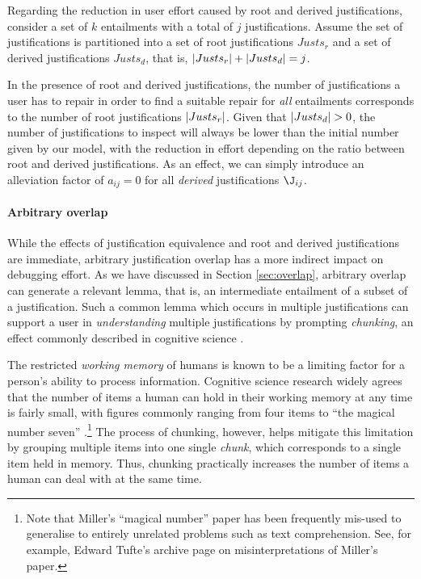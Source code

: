 Regarding the reduction in user effort caused by root and derived justifications, consider a set of $k$ entailments with a total of $j$ justifications. Assume the set of justifications is partitioned into a set of root justifications $Justs_{r}$ and a set of derived justifications $Justs_{d}$, that is, $ \left|{Justs_{r}}\right| +  \left|{Justs_{d}}\right| = j$.

In the presence of root and derived justifications, the number of justifications a user has to repair in order to find a suitable repair for \emph{all} entailments corresponds to the number of root justifications $ \left|{Justs_{r}}\right|$. Given that $ \left|{Justs_{d}}\right| > 0$, the number of justifications to inspect will always be lower than the initial number given by our model, with the reduction in effort depending on the ratio between root and derived justifications. As an effect, we can simply introduce an alleviation factor of $a_{ij} = 0$ for all \emph{derived} justifications $\J_{ij}$.

\paragraph{Arbitrary overlap}

While the effects of justification equivalence and root and derived justifications are immediate, arbitrary justification overlap has a more indirect impact on debugging effort. As we have discussed in Section \ref{sec:overlap}, arbitrary overlap can generate a relevant lemma, that is, an intermediate entailment of a subset of a justification. Such a common lemma which occurs in multiple justifications can support a user in \emph{understanding} multiple justifications by prompting \emph{chunking}, an effect commonly described in cognitive science \cite{miller56aa,gobet01aa}.

The restricted \emph{working memory} of humans is known to be a limiting factor for a person's ability to process information. Cognitive science research widely agrees that the number of items a human can hold in their working memory at any time is fairly small, with figures commonly ranging from four items \cite{halford05vg} to \enquote{the magical number seven} \cite{miller56aa}.\footnote{Note that Miller's \enquote{magical number} paper has been frequently mis-used to generalise to entirely unrelated problems such as text comprehension. See, for example, Edward Tufte's archive page \cite{tuftenumber7} on misinterpretations of Miller's paper.} The process of chunking, however, helps mitigate this limitation by grouping multiple items into one single \emph{chunk}, which corresponds to a single item held in memory. Thus, chunking practically increases the number of items a human can deal with at the same time.

